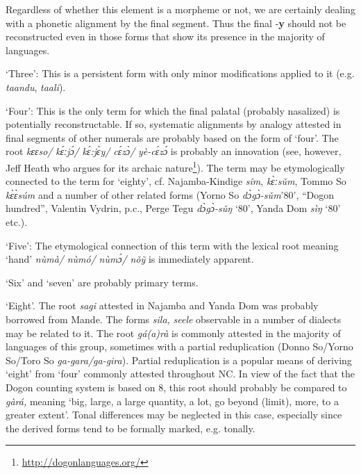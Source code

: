 Regardless of whether this element is a morpheme or not, we are certainly dealing with a phonetic alignment by the final segment. Thus the final -\textbf{y} should not be reconstructed even in those forms that show its presence in the majority of languages. 

‘Three’: This is a persistent form with only minor modifications applied to it (e.g. \textit{taandu}, \textit{taali}). 

‘Four’: This is the only term for which the final palatal (probably nasalized) is potentially reconstructable. If so, systematic alignments by analogy attested in final segments of other numerals are probably based on the form of ‘four’. The root \textit{kɛɛso/} \textit{k{\'{ɛ}}ːj{\'{ɔ}}/} \textit{k{\'{ɛ}}:j{\`{ɛ}}y/} \textit{c{\'{ɛ}}z{\`{ɔ}}/} \textit{yè-c{\'{ɛ}}z{\'{ɔ}}} is probably an innovation (see, however, Jeff Heath who argues for its archaic nature\footnote{\href{http://dogonlanguages.org/}{http}\href{http://dogonlanguages.org/}{://}\href{http://dogonlanguages.org/}{dogonlanguages}\href{http://dogonlanguages.org/}{.}\href{http://dogonlanguages.org/}{org}\href{http://dogonlanguages.org/}{/}}). The term may be etymologically connected to the term for ‘eighty’, cf. Najamba-Kindige \textit{s{\^{i}}m}, \textit{k{\`{ɛ}}ːs{\v{u}}m}, Tommo So \textit{k{\`{ɛ}}{\`{ɛ}}s{\'{u}}m} and a number of other related forms (Yorno So \textit{d{\`{ɔ}}g{\`{ɔ}}-s{\v{u}}m}’80’, “Dogon hundred”, Valentin Vydrin, p.c., Perge Tegu \textit{d{\`{ɔ}}g{\`{ɔ}}-s{\v{u}}ŋ} ‘80’, Yanda Dom \textit{sìŋ} ‘80’ etc.).

‘Five’: The etymological connection of this term with the lexical root meaning ‘hand’ \textit{n{\`{u}}mà/} \textit{n{\`{u}}mó/} \textit{n{\`{u}}m{\'{ɔ}}/} \textit{n{\v{o}}{\~{y}}} is immediately apparent.

‘Six’ and ‘seven’ are probably primary terms. 

‘Eight’. The root \textit{sagi} attested in Najamba and Yanda Dom was probably borrowed from Mande. The forms \textit{sila,} \textit{seele} observable in a number of dialects may be related to it. The root  \textit{gá(a)rà} is commonly attested in the majority of languages of this group, sometimes with a partial reduplication (Donno So/Yorno So/Toro So \textit{ga-gara/ga-gira}). Partial reduplication is a popular means of deriving ‘eight’ from ‘four’ commonly attested throughout NC. In view of the fact that the Dogon counting system is based on 8, this root should probably be compared to \textit{gàrá,} meaning ‘big, large, a large quantity, a lot, go beyond (limit), more, to a greater extent’. Tonal differences may be neglected in this case, especially since the derived forms tend to be formally marked, e.g. tonally.

